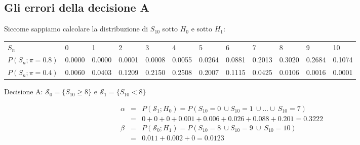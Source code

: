\documentclass[
  11pt,
]{book}
\theoremstyle{mytheoremstyle}
\theoremstyle{mydefstyle}
\begin{document}
\subsection{Gli errori della decisione A}\label{gli-errori-della-decisione-a}

Siccome sappiamo calcolare la distribuzione di \(S_{10}\) sotto \(H_0\) e sotto \(H_1\):

\scriptsize
\begin{table}
\centering\begingroup\fontsize{10}{12}\selectfont

\begin{tabular}{l>{}l>{}l>{}l>{}l>{}l>{}l>{}l>{}l>{}l>{}l>{}l}
\toprule
$S_n$ & \textcolor[HTML]{AB292E}{0} & \textcolor[HTML]{AB292E}{1} & \textcolor[HTML]{AB292E}{2} & \textcolor[HTML]{AB292E}{3} & \textcolor[HTML]{AB292E}{4} & \textcolor[HTML]{AB292E}{5} & \textcolor[HTML]{AB292E}{6} & \textcolor[HTML]{AB292E}{7} & \textcolor[HTML]{012D50}{8} & \textcolor[HTML]{012D50}{9} & \textcolor[HTML]{012D50}{10}\\
$P(S_n;\pi=0.8)$ & \textcolor[HTML]{AB292E}{0.0000} & \textcolor[HTML]{AB292E}{0.0000} & \textcolor[HTML]{AB292E}{0.0001} & \textcolor[HTML]{AB292E}{0.0008} & \textcolor[HTML]{AB292E}{0.0055} & \textcolor[HTML]{AB292E}{0.0264} & \textcolor[HTML]{AB292E}{0.0881} & \textcolor[HTML]{AB292E}{0.2013} & \textcolor[HTML]{012D50}{0.3020} & \textcolor[HTML]{012D50}{0.2684} & \textcolor[HTML]{012D50}{0.1074}\\
$P(S_n;\pi=0.4)$ & \textcolor[HTML]{AB292E}{0.0060} & \textcolor[HTML]{AB292E}{0.0403} & \textcolor[HTML]{AB292E}{0.1209} & \textcolor[HTML]{AB292E}{0.2150} & \textcolor[HTML]{AB292E}{0.2508} & \textcolor[HTML]{AB292E}{0.2007} & \textcolor[HTML]{AB292E}{0.1115} & \textcolor[HTML]{AB292E}{0.0425} & \textcolor[HTML]{012D50}{0.0106} & \textcolor[HTML]{012D50}{0.0016} & \textcolor[HTML]{012D50}{0.0001}\\
\bottomrule
\end{tabular}
\endgroup{}
\end{table}
\normalsize

Decisione A: \(\mathcal{S}_0=\{S_{10}\geq 8\}\) e \(\mathcal{S}_1=\{S_{10}< 8\}\)

\begin{eqnarray*}
  \alpha &=& P(\mathcal{S}_{1};H_0)=P(S_{10}=0~\cup S_{10}=1~\cup...\cup~ S_{10}=7)\\
  &=&0+0+0+0.001+0.006+0.026+0.088+0.201=0.3222\\
  \beta &=& P(\mathcal{S}_{0};H_1)=P(S_{10}=8~\cup S_{10}=9~\cup~ S_{10}=10)\\
  &=&0.011+0.002+0=0.0123
\end{eqnarray*}
\end{document}
